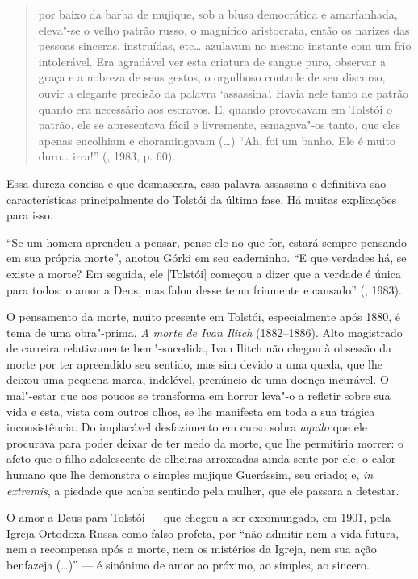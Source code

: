 \begin{quotation}
por baixo da barba de mujique, sob a blusa democrática e amarfanhada, eleva"-se o velho patrão russo, o magnífico aristocrata, então os narizes das pessoas sinceras, instruídas, etc\ldots{} azulavam no mesmo instante com um frio intolerável. Era agradável ver esta criatura de sangue puro, observar a graça e a nobreza de seus gestos, o orgulhoso controle de seu discurso, ouvir a
elegante precisão da palavra `assassina'. Havia nele tanto de patrão quanto era necessário aos escravos. E, quando provocavam em Tolstói o patrão, ele se apresentava fácil e livremente, esmagava"-os tanto, que eles apenas encolhiam e choramingavam (\ldots{}) ``Ah, foi um banho. Ele é muito duro\ldots{} irra!'' (, 1983, p. 60).
\end{quotation}

Essa dureza concisa e que desmascara, essa palavra
assassina e definitiva são características principalmente do Tolstói
da última fase. Há muitas explicações para isso.

``Se um homem aprendeu a pensar, pense ele no que
for, estará sempre pensando em sua própria morte'', anotou Górki em
seu caderninho. ``E que verdades há, se existe a morte? Em seguida,
ele [Tolstói] começou a dizer que a verdade é única para todos: o
amor a Deus, mas falou desse tema friamente e cansado'' (, 1983).

O pensamento da morte, muito presente em Tolstói, especialmente após 1880, é tema de uma obra"-prima, \emph{A morte de Ivan Ilitch} (1882--1886). Alto magistrado de carreira relativamente bem"-sucedida, Ivan Ilitch não chegou à obsessão da morte por ter apreendido seu sentido, mas sim devido a uma queda, que lhe deixou uma pequena marca, indelével, prenúncio de uma doença incurável. O mal"-estar que aos poucos se transforma em horror leva"-o a refletir sobre sua vida e esta, vista com outros olhos, se
lhe manifesta em toda a sua trágica inconsistência. Do implacável desfazimento em curso sobra \emph{aquilo} que ele procurava para poder deixar de ter medo da morte, que lhe permitiria morrer: o afeto que o filho adolescente de olheiras
arroxeadas ainda sente por ele; o calor humano que lhe demonstra o simples mujique Guerássim, seu criado; e, \emph{in extremis}, a
piedade que acaba sentindo pela mulher, que ele passara a detestar.

O amor a Deus para Tolstói --- que chegou a ser excomungado, em 1901, pela
Igreja Ortodoxa Russa como falso profeta,
por ``não admitir nem a vida futura, nem a recompensa após a
morte, nem os mistérios da Igreja, nem sua ação benfazeja (\ldots{})'' --- é
sinônimo de amor ao próximo, ao simples, ao sincero.

